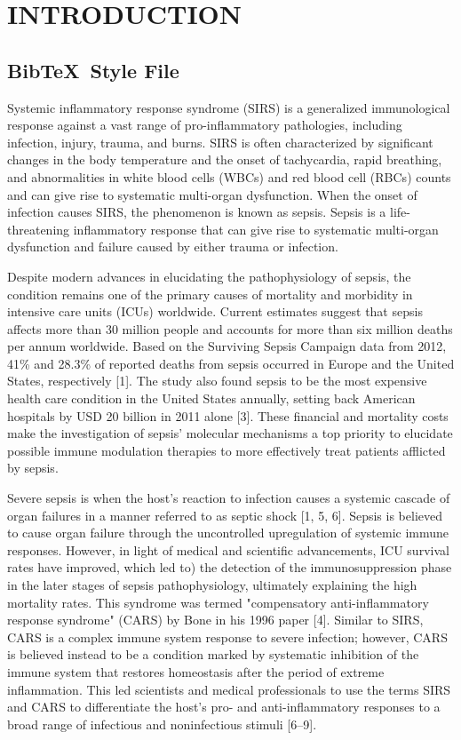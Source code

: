 
\chapter{INTRODUCTION}

\section{Bib\TeX\ Style File}
Systemic inflammatory response syndrome (SIRS) is a generalized
immunological response against a vast range of pro-inflammatory
pathologies, including infection, injury, trauma, and burns. SIRS is
often characterized by significant changes in the body temperature and
the onset of tachycardia, rapid breathing, and abnormalities in white
blood cells (WBCs) and red blood cell (RBCs) counts and can give rise to
systematic multi-organ dysfunction. When the onset of infection causes
SIRS, the phenomenon is known as sepsis. Sepsis is a life-threatening
inflammatory response that can give rise to systematic multi-organ
dysfunction and failure caused by either trauma or infection.

Despite modern advances in elucidating the pathophysiology of sepsis,
the condition remains one of the primary causes of mortality and
morbidity in intensive care units (ICUs) worldwide. Current estimates
suggest that sepsis affects more than 30 million people and accounts for
more than six million deaths per annum worldwide. Based on the Surviving
Sepsis Campaign data from 2012, 41\% and 28.3\% of reported deaths from
sepsis occurred in Europe and the United States, respectively {[}1{]}.
The study also found sepsis to be the most expensive health care
condition in the United States annually, setting back American hospitals
by USD 20 billion in 2011 alone {[}3{]}. These financial and mortality
costs make the investigation of sepsis' molecular mechanisms a top
priority to elucidate possible immune modulation therapies to more
effectively treat patients afflicted by sepsis.

Severe sepsis is when the host's reaction to infection causes a systemic
cascade of organ failures in a manner referred to as septic shock {[}1,
5, 6{]}. Sepsis is believed to cause organ failure through the
uncontrolled upregulation of systemic immune responses. However, in
light of medical and scientific advancements, ICU survival rates have
improved, which led to) the detection of the immunosuppression phase in
the later stages of sepsis pathophysiology, ultimately explaining the
high mortality rates. This syndrome was termed "compensatory
anti-inflammatory response syndrome" (CARS) by Bone in his 1996 paper
{[}4{]}. Similar to SIRS, CARS is a complex immune system response to
severe infection; however, CARS is believed instead to be a condition
marked by systematic inhibition of the immune system that restores
homeostasis after the period of extreme inflammation. This led
scientists and medical professionals to use the terms SIRS and CARS to
differentiate the host's pro- and anti-inflammatory responses to a broad
range of infectious and noninfectious stimuli {[}6--9{]}.

